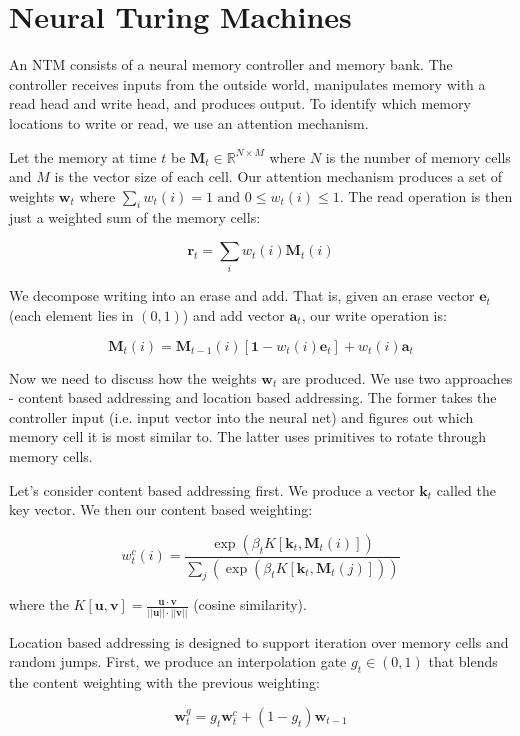 \documentclass[a4paper]{article}
\begin{document}
\section{Neural Turing Machines}
An NTM consists of a neural memory controller and memory bank. The controller
receives inputs from the outside world, manipulates memory with a read head and
write head, and produces output. To identify which memory locations to write
or read, we use an attention mechanism.

Let the memory at time $t$ be $\mathbf{M}_t \in \mathbb{R}^{N \times M}$
where $N$ is the number of memory cells and $M$ is the vector size of each
cell. Our attention mechanism produces a set of weights $\mathbf{w}_t$ where
$\sum_{i}{w_t(i)} = 1 \text{ and } 0 \leq w_t(i) \leq 1$. The read operation
is then just a weighted sum of the memory cells:

$$
\mathbf{r}_t = \sum_{i}{w_t(i) \mathbf{M}_t(i)}
$$

We decompose writing into an erase and add. That is, given an erase vector
$\mathbf{e}_t$ (each element lies in $(0, 1)$) and add vector $\mathbf{a}_t$,
our write operation is:

$$
\mathbf{M}_t(i) = \mathbf{M}_{t-1}(i)[\mathbf{1} - w_t(i) \mathbf{e}_t]
+ w_t(i) \mathbf{a}_t
$$

Now we need to discuss how the weights $\mathbf{w}_t$ are produced. We use two
approaches - content based addressing and location based addressing. The former
takes the controller input (i.e. input vector into the neural net) and figures
out which memory cell it is most similar to. The latter uses primitives to
rotate through memory cells.

Let's consider content based addressing first. We produce a vector
$\mathbf{k}_t$ called the key vector. We then our content based weighting:

$$
w_t^c(i) = \frac{
\exp{(\beta_t K[\mathbf{k}_t, \mathbf{M}_t(i)])}
}{
\sum_{j}{(\exp{(\beta_t K[\mathbf{k}_t, \mathbf{M}_t(j)])})}
}
$$

where the $K[\mathbf{u}, \mathbf{v}] = \frac{\mathbf{u} \cdot \mathbf{v}}{
||\mathbf{u}|| \cdot || \mathbf{v}||}$ (cosine similarity).

Location based addressing is designed to support iteration over memory cells
and random jumps. First, we produce an interpolation gate $g_t \in (0, 1)$ that
blends the content weighting with the previous weighting:

$$
\mathbf{w}_t^g = g_t \mathbf{w}_t^c + (1 - g_t) \mathbf{w}_{t-1}
$$
\end{document}
